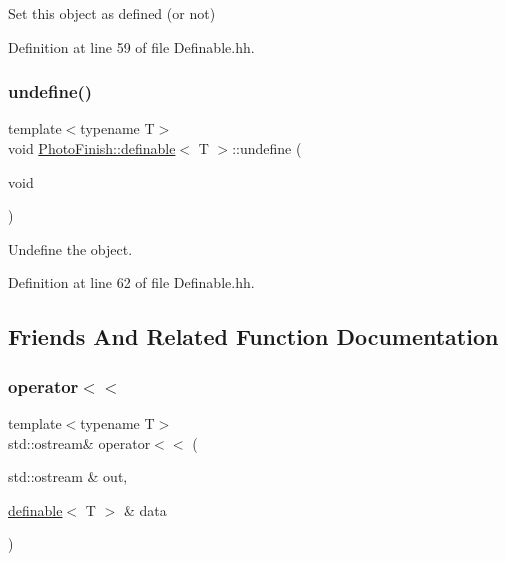 Set this object as \textquotesingle{}defined\textquotesingle{} (or not) 



Definition at line 59 of file Definable.\+hh.

\mbox{\label{class_photo_finish_1_1definable_ab8b9336f1125a05efaa698f1faad0b89}} 
\subsubsection{\texorpdfstring{undefine()}{undefine()}}
{\footnotesize\ttfamily template$<$typename T$>$ \\
void \hyperlink{class_photo_finish_1_1definable}{Photo\+Finish\+::definable}$<$ T $>$\+::undefine (\begin{DoxyParamCaption}\item[{void}]{ }\end{DoxyParamCaption})\hspace{0.3cm}{\ttfamily [inline]}}



Undefine the object. 



Definition at line 62 of file Definable.\+hh.



\subsection{Friends And Related Function Documentation}
\mbox{\label{class_photo_finish_1_1definable_a54dc7324456d4b6642fd684552720cf2}} 
\subsubsection{\texorpdfstring{operator$<$$<$}{operator<<}}
{\footnotesize\ttfamily template$<$typename T$>$ \\
std\+::ostream\& operator$<$$<$ (\begin{DoxyParamCaption}\item[{std\+::ostream \&}]{out,  }\item[{\hyperlink{class_photo_finish_1_1definable}{definable}$<$ T $>$ \&}]{data }\end{DoxyParamCaption})\hspace{0.3cm}{\ttfamily [friend]}}



